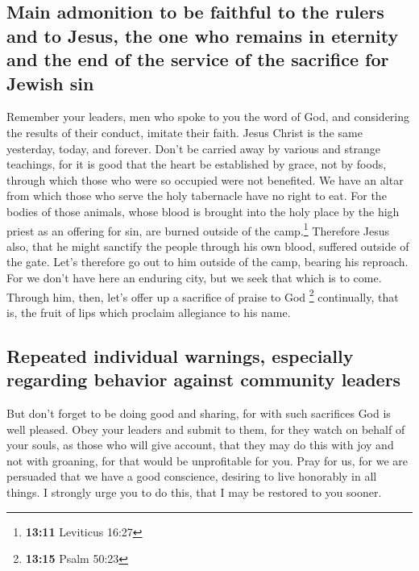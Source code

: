 \hypertarget{main-admonition-to-be-faithful-to-the-rulers-and-to-jesus-the-one-who-remains-in-eternity-and-the-end-of-the-service-of-the-sacrifice-for-jewish-sin}{%
\subsection{Main admonition to be faithful to the rulers and to Jesus,
the one who remains in eternity and the end of the service of the
sacrifice for Jewish
sin}\label{main-admonition-to-be-faithful-to-the-rulers-and-to-jesus-the-one-who-remains-in-eternity-and-the-end-of-the-service-of-the-sacrifice-for-jewish-sin}}

 Remember your leaders, men who spoke to you the word of
God, and considering the results of their conduct, imitate their faith.
 Jesus Christ is the same yesterday, today, and forever.
 Don't be carried away by various and strange teachings,
for it is good that the heart be established by grace, not by foods,
through which those who were so occupied were not benefited.
 We have an altar from which those who serve the holy
tabernacle have no right to eat.  For the bodies of those
animals, whose blood is brought into the holy place by the high priest
as an offering for sin, are burned outside of the camp.\footnote{\textbf{13:11}
  Leviticus 16:27}  Therefore Jesus also, that he might
sanctify the people through his own blood, suffered outside of the gate.
 Let's therefore go out to him outside of the camp,
bearing his reproach.  For we don't have here an enduring
city, but we seek that which is to come.  Through him,
then, let's offer up a sacrifice of praise to God \footnote{\textbf{13:15}
  Psalm 50:23} continually, that is, the fruit of lips which proclaim
allegiance to his name.

\hypertarget{repeated-individual-warnings-especially-regarding-behavior-against-community-leaders}{%
\subsection{Repeated individual warnings, especially regarding behavior
against community
leaders}\label{repeated-individual-warnings-especially-regarding-behavior-against-community-leaders}}

 But don't forget to be doing good and sharing, for with
such sacrifices God is well pleased.  Obey your leaders
and submit to them, for they watch on behalf of your souls, as those who
will give account, that they may do this with joy and not with groaning,
for that would be unprofitable for you.  Pray for us, for
we are persuaded that we have a good conscience, desiring to live
honorably in all things.  I strongly urge you to do this,
that I may be restored to you sooner.


